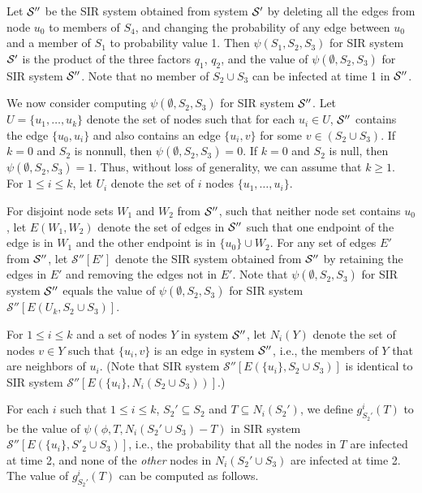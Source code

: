 Let $\mbox{${\cal S}''$}$ be the SIR system obtained from system $\mbox{$\mathcal{S}'$}$ by deleting 
all the edges from node $u_0$ to members of $S_4$,
and changing the probability of any edge between $u_0$ and a member of $S_1$ 
to probability value 1.
Then $\psi(S_1, S_2, S_3)$ for  SIR system $\mbox{$\mathcal{S}'$}$ 
is the product of the three factors $q_1$, $q_2$, and
the value of $\psi(\emptyset, S_2, S_3)$ for  SIR system $\mbox{${\cal S}''$}$.
Note that no member of $S_2 \cup S_3$ can be infected at time 1 in $\mbox{${\cal S}''$}$.

We now consider computing $\psi(\emptyset, S_2, S_3)$ for  SIR system $\mbox{${\cal S}''$}$.
Let $U=\{u_1,\ldots,u_k\}$ denote the set of nodes such that for each
$u_i\in U$, $\mbox{${\cal S}''$}{}$ contains the edge $\{u_0, u_i\}$ and also contains an edge $\{u_i, v\}$
for some $v\in (S_2 \cup S_3)$. 
If $k = 0$ and $S_2$ is nonnull, then $\psi(\emptyset, S_2, S_3) = 0$. 
If $k = 0$ and $S_2$ is null, then $\psi(\emptyset, S_2, S_3) = 1$. 
Thus, without loss of generality, we can assume that $k \geq 1$.
For $1 \leq i \leq k$, let $U_i$ denote the set of $i$ nodes $\{u_1,\ldots,u_i\}$.

For disjoint node sets $W_1$ and $W_2$ from $\mbox{${\cal S}''$}{}$, such that neither node set contains  $u_0$,
let $E(W_1, W_2)$ denote the set of edges in $\mbox{${\cal S}''$}{}$
such that one endpoint of the edge is in $W_1$ and the other endpoint is in $\{u_0\} \cup W_2$.
For any set of edges $E'$ from $\mbox{${\cal S}''$}{}$,
let $\mathcal{S}''[E']$ denote the SIR system obtained from $\mbox{${\cal S}''$}{}$
by retaining the edges in $E'$
and removing the edges not in $E'$.
Note that $\psi(\emptyset, S_2, S_3)$ for SIR system $\mbox{${\cal S}''$}$
equals the value of $\psi(\emptyset, S_2, S_3)$ for SIR system 
$\mathcal{S}''[E(U_k, S_2 \cup S_3)]$.

For $1 \leq i \leq k$ and a set of nodes $Y$ in system $\mbox{${\cal S}''$}{}$, 
let $N_i(Y)$ denote 
the set of nodes $v\in Y$
such that $\{u_i, v\}$ is an edge in system $\mbox{${\cal S}''$}{}$,
i.e., the members of $Y$ that are neighbors of $u_i$.
(Note that SIR system $\mathcal{S}''[E(\{ u_i  \}, S_2 \cup S_3)]$
is identical to SIR system $\mathcal{S}''[E(\{ u_i  \}, N_i(S_2 \cup S_3))]$.)

For each $i$ such that $1 \leq i \leq k$, $S_2' \subseteq S_2$ and $T \subseteq N_i(S_2')$,
we define $g^i_{S_2'}(T)$ to be
the value of $\psi(\phi, T, N_i(S_2' \cup S_3) - T)$ in SIR system
$\mathcal{S}''[E(\{ u_i \}, S'_2 \cup S_3)]$,
i.e., the probability that
all the nodes in $T$ are infected at time 2, 
and none of the {\em other} nodes in $N_i(S_2' \cup S_3)$ are infected at time 2.
The value of $g^i_{S_2'}(T)$ can be computed as follows.

